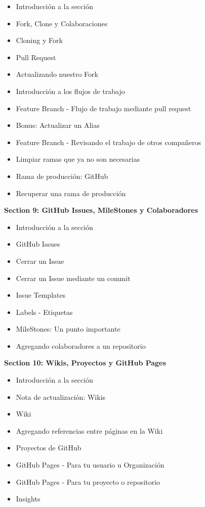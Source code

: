 \documentclass[
]{book}
\providecommand{\tightlist}{%
  \setlength{\itemsep}{0pt}\setlength{\parskip}{0pt}}
\begin{document}
\begin{itemize}
\tightlist
\item
  Introducción a la sección
\item
  Fork, Clone y Colaboraciones
\item
  Cloning y Fork
\item
  Pull Request
\item
  Actualizando nuestro Fork
\item
  Introducción a los flujos de trabajo
\item
  Feature Branch - Flujo de trabajo mediante pull request
\item
  Bonus: Actualizar un Alias
\item
  Feature Branch - Revisando el trabajo de otros compañeros
\item
  Limpiar ramas que ya no son necesarias
\item
  Rama de producción: GitHub
\item
  Recuperar una rama de producción
\end{itemize}

\textbf{Section 9: GitHub Issues, MileStones y Colaboradores}

\begin{itemize}
\tightlist
\item
  Introducción a la sección
\item
  GitHub Issues
\item
  Cerrar un Issue
\item
  Cerrar un Issue mediante un commit
\item
  Issue Templates
\item
  Labels - Etiquetas
\item
  MileStones: Un punto importante
\item
  Agregando colaboradores a un repositorio
\end{itemize}

\textbf{Section 10: Wikis, Proyectos y GitHub Pages}

\begin{itemize}
\tightlist
\item
  Introducción a la sección
\item
  Nota de actualización: Wikis
\item
  Wiki
\item
  Agregando referencias entre páginas en la Wiki
\item
  Proyectos de GitHub
\item
  GitHub Pages - Para tu usuario u Organización
\item
  GitHub Pages - Para tu proyecto o repositorio
\item
  Insights
\end{itemize}
\end{document}
